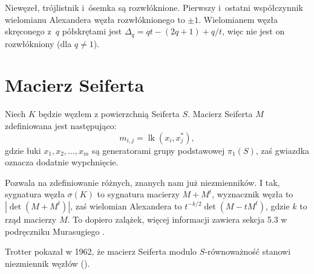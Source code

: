Niewęzeł, trójlistnik i~ósemka są rozwłóknione.
Pierwszy i~ostatni współczynnik wielomianu Alexandera węzła rozwłóknionego to $\pm 1$.
Wielomianem węzła skręconego z~$q$ półskrętami jest $\Delta_q = qt - (2q+1)+q/t$, więc nie jest on rozwłókniony (dla $q \neq 1$).



\section{Macierz Seiferta} %
Niech $K$ będzie węzłem z powierzchnią Seiferta $S$.
Macierz Seiferta $M$ zdefiniowana jest następująco:
\[
	m_{i,j} = \operatorname{lk}(x_i, x_j^*),
\]
gdzie łuki $x_1, x_2, \ldots, x_m$ są generatorami grupy podstawowej $\pi_1(S)$, zaś gwiazdka oznacza dodatnie wypchnięcie.

Pozwala na zdefiniowanie różnych, znanych nam już niezmienników.
I tak, sygnatura węzła $\sigma(K)$ to sygnatura macierzy $M + M^t$, wyznacznik węzła to $|\det(M+M^t)|$, zaś wielomian Alexandera to $t^{-k/2}\det(M - tM^t)$, gdzie $k$ to rząd macierzy $M$.
To dopiero zalążek, więcej informacji zawiera sekcja 5.3 w podręczniku Murasugiego \cite{murasugi96}.

Trotter pokazał w 1962, że macierz Seiferta modulo $S$-równoważność stanowi niezmiennik węzłów (\cite{trotter62}).
